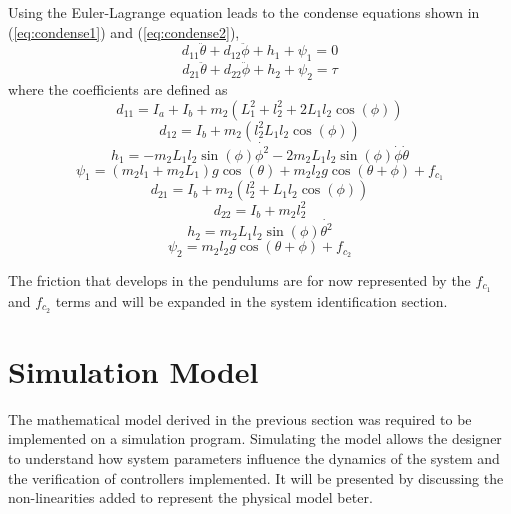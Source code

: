 Using the Euler-Lagrange equation leads to the condense equations shown in (\ref{eq:condense1}) and (\ref{eq:condense2}),
\begin{equation} \label{eq:condense1}
d_{11}\ddot{\theta}+d_{12}\ddot{\phi} + h_{1} + \psi_{1} = 0
\end{equation}
\begin{equation} \label{eq:condense2}
d_{21}\ddot{\theta} + d_{22}\ddot{\phi} + h_{2} + \psi_{2} = \tau
\end{equation}
where the coefficients are defined as
\begin{equation} \label{eq:d11}
d_{11} = I_{a} + I_{b} + m_{2}(L_{1}^2 + l_{2}^2+2L_{1}l_{2}\cos(\phi))
\end{equation}
\begin{equation} \label{eq:d12}
d_{12} = I_{b} +m_{2}(l_{2}^2 L_{1}l_{2}\cos(\phi))
\end{equation}
\begin{equation} \label{eq:h1}
h_{1} = -m_{2}L_{1}l_{2}\sin(\phi)\dot{\phi^2}-2m_{2}L_{1}l_{2}\sin(\phi)\dot{\phi}\dot{\theta}
\end{equation}
\begin{equation} \label{eq:psi1}
\psi_{1} = (m_{2}l_{1}+m_{2}L_{1})g\cos(\theta) + m_{2}l_{2}g\cos(\theta+\phi) + f_{c_{1}}
\end{equation}
\begin{equation} \label{eq:d21}
d_{21}= I_{b}+m_{2}(l_{2}^2+L_{1}l_{2}\cos(\phi))
\end{equation}
\begin{equation} \label{eq:d22}
d_{22}= I_{b}+ m_{2}l_{2}^2
\end{equation}
\begin{equation} \label{eq:h2}
h_{2}= m_{2}L_{1}l_{2}\sin(\phi)\dot{\theta^2}
\end{equation}
\begin{equation} \label{eq:psi2}
\psi_{2}= m_{2}l_{2}g\cos(\theta+\phi) + f_{c_{2}}
\end{equation}

The friction that develops in the pendulums are for now represented by the $f_{c_{1}}$ and $f_{c_{2}}$ terms and will be expanded in the system identification section.

\section{Simulation Model}
The mathematical model derived in the previous section was required to be implemented on a simulation program. Simulating the model allows the designer to understand how system parameters influence the dynamics of the system and the verification of controllers implemented. It will be presented by discussing the non-linearities added to represent the physical model beter.\\

